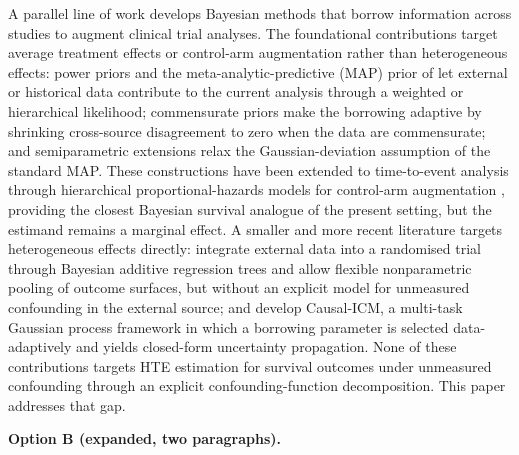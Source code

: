 A parallel line of work develops Bayesian methods that borrow information across studies to augment clinical trial analyses.
The foundational contributions target average treatment effects or control-arm augmentation rather than heterogeneous effects: power priors \citep{ibrahim2000power} and the meta-analytic-predictive (MAP) prior of \citet{neuenschwander2010} let external or historical data contribute to the current analysis through a weighted or hierarchical likelihood; commensurate priors \citep{hobbs2011,hobbs2012commensurate} make the borrowing adaptive by shrinking cross-source disagreement to zero when the data are commensurate; and semiparametric extensions \citep{hupf2021bayesian} relax the Gaussian-deviation assumption of the standard MAP.
These constructions have been extended to time-to-event analysis through hierarchical proportional-hazards models for control-arm augmentation \citep{alt2025control}, providing the closest Bayesian survival analogue of the present setting, but the estimand remains a marginal effect.
A smaller and more recent literature targets heterogeneous effects directly: \citet{zhou2021incorporating} integrate external data into a randomised trial through Bayesian additive regression trees and allow flexible nonparametric pooling of outcome surfaces, but without an explicit model for unmeasured confounding in the external source; and \citet{dimitriou2025causal} develop Causal-ICM, a multi-task Gaussian process framework in which a borrowing parameter is selected data-adaptively and yields closed-form uncertainty propagation.
None of these contributions targets HTE estimation for survival outcomes under unmeasured confounding through an explicit confounding-function decomposition.
This paper addresses that gap.

\textbf{Option B (expanded, two paragraphs).}


